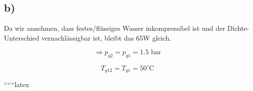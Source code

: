 

\subsection*{b)}

Da wir annehmen, dass festes/flüssiges Wasser inkompressibel ist und der Dichte-Unterschied vernachlässigbar ist, bleibt das 65W gleich. 

\[
\Rightarrow p_{g2} = p_{g1} = 1.5 \text{ bar}
\]

\[
T_{g12} = T_{g1} = 50^\circ \text{C}
\]

``````latex